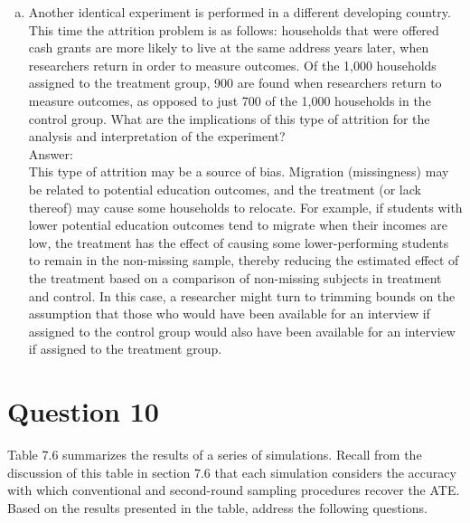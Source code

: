 \documentclass[11pt,notitlepage]{article}\usepackage[]{graphicx}\usepackage[]{color}
\begin{document}
\begin{enumerate}[a)]
\item Another identical experiment is performed in a different developing country. This time the attrition problem is as follows: households that were offered cash grants are more likely to live at the same address years later, when researchers return in order to measure outcomes. Of the 1,000 households assigned to the treatment group, 900 are found when researchers return to measure outcomes, as opposed to just 700 of the 1,000 households in the control group. What are the implications of this type of attrition for the analysis and interpretation of the experiment?\\
Answer:\\
This type of attrition may be a source of bias. Migration (missingness) may be related to potential education outcomes, and the treatment (or lack thereof) may cause some households to relocate. For example, if students with lower potential education outcomes tend to migrate when their incomes are low, the treatment has the effect of causing some lower-performing students to remain in the non-missing sample, thereby reducing the estimated effect of the treatment based on a comparison of non-missing subjects in treatment and control. In this case, a researcher might turn to trimming bounds on the assumption that those who would have been available for an interview if assigned to the control group would also have been available for an interview if assigned to the treatment group.
\end{enumerate}

\section*{Question 10}
Table 7.6 summarizes the results of a series of simulations. Recall from the discussion of this table in section 7.6 that each simulation considers the accuracy with which conventional and second-round sampling procedures recover the ATE. Based on the results presented in the table, address the following questions.
\end{document}
